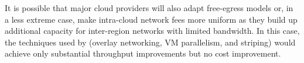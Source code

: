 It is possible that major cloud providers will also adapt free-egress models or, in a less extreme case, make intra-cloud network fees more uniform as they build up additional capacity for inter-region networks with limited bandwidth. In this case, the techniques used by \sys{} (overlay networking, VM parallelism, and striping) would achieve only substantial throughput improvements but no cost improvement.



